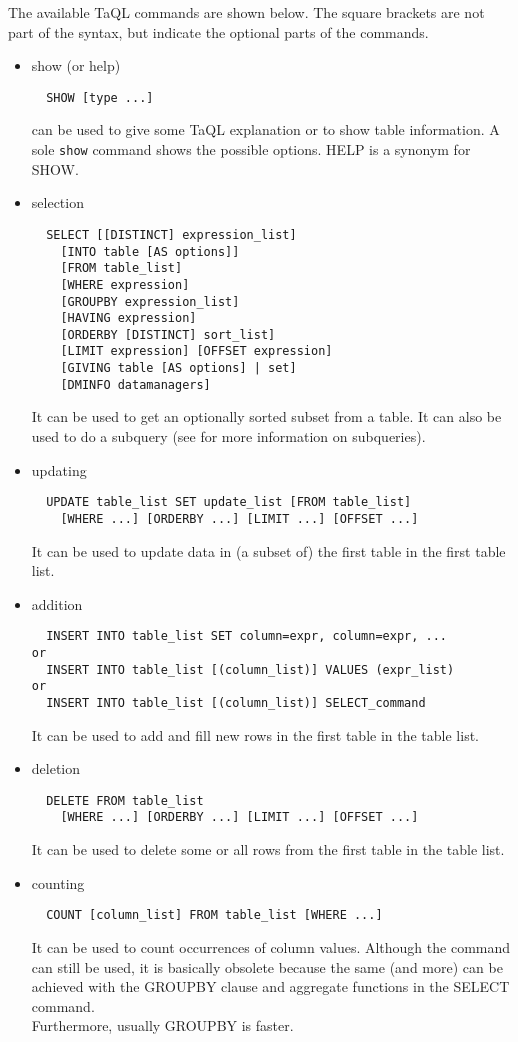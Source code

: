 The available TaQL commands are shown below. The square brackets are
not part of the syntax, but indicate the optional parts of the commands.
\begin{itemize}
\item show (or help)
\begin{verbatim}
  SHOW [type ...]
\end{verbatim}
can be used to give some TaQL explanation or to show table
information. A sole {\tt show} command shows the possible options.
HELP is a synonym for SHOW.

\item selection
\begin{verbatim}
  SELECT [[DISTINCT] expression_list]
    [INTO table [AS options]]
    [FROM table_list]
    [WHERE expression]
    [GROUPBY expression_list]
    [HAVING expression]
    [ORDERBY [DISTINCT] sort_list]
    [LIMIT expression] [OFFSET expression]
    [GIVING table [AS options] | set]
    [DMINFO datamanagers]
\end{verbatim}
It can be used to get an optionally sorted subset from a table. It can
also be used to do a subquery
(see  
for more information on subqueries).

\item updating
\begin{verbatim}
  UPDATE table_list SET update_list [FROM table_list]
    [WHERE ...] [ORDERBY ...] [LIMIT ...] [OFFSET ...]
\end{verbatim}
It can be used to update data in (a subset of) the first table in the
first table list. 

\item addition
\begin{verbatim}
  INSERT INTO table_list SET column=expr, column=expr, ...
or
  INSERT INTO table_list [(column_list)] VALUES (expr_list)
or
  INSERT INTO table_list [(column_list)] SELECT_command
\end{verbatim}
It can be used to add and fill new rows in the first table in the
table list.

\item deletion
\begin{verbatim}
  DELETE FROM table_list
    [WHERE ...] [ORDERBY ...] [LIMIT ...] [OFFSET ...]
\end{verbatim}
It can be used to delete some or all rows from the first table
in the table list.

\item counting
\begin{verbatim}
  COUNT [column_list] FROM table_list [WHERE ...]
\end{verbatim}
It can be used to count occurrences of column values. Although the
command can still be used, it is basically
obsolete because the same (and more) can be achieved with the GROUPBY
clause and aggregate functions in the SELECT command.
\\Furthermore, usually GROUPBY is faster.


\end{itemize}
